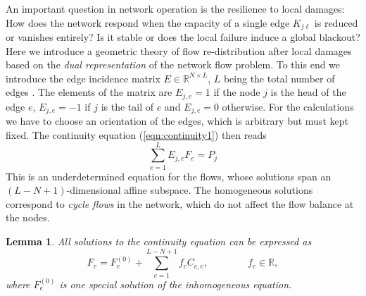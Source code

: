 \documentclass[10pt,aps,pra,twocolumn,superscriptaddress]{revtex4-1}
\newcommand{\be}{\begin{equation}}
\newcommand{\ee}{\end{equation}}
\newtheorem{lemma}{Lemma}
\begin{document}
An important question in network operation is the resilience to local damages: How does the network respond when the capacity of a single edge $K_{j \ell}$ is reduced or vanishes entirely? Is it stable or does the local failure induce a global blackout? Here we introduce a geometric theory of flow re-distribution after local damages based on the \emph{dual representation} of the network flow problem. To this end we introduce the edge incidence matrix $E \in \mathbb{R}^{N \times L}$, $L$ being the total number of edges \cite{Newm10}. The elements of the matrix are $E_{j,e}=1$ if the node $j$ is the head of the edge $e$, $E_{j,e}=-1$ if $j$ is the tail of $e$ and $E_{j,e}=0$ otherwise. For the calculations we have to choose an orientation of the edges, which is arbitrary but must kept fixed. The continuity equation (\ref{eqn:continuity1}) then reads
\be
    \sum_{e=1}^L E_{j,e} F_e = P_j
    \label{eqn:continuity3}
\ee
This is an underdetermined equation for the flows, whose solutions span an $(L-N+1)$-dimensional affine subspace. The homogeneous solutions correspond to \emph{cycle flows} in the network, which do not affect the flow balance at the nodes. 


\begin{lemma} 
All solutions to the continuity equation can be expressed as
\be
   F_e = F_e^{(0)} + \sum_{c=1}^{L-N+1} f_c C_{c,e}, \qquad \qquad
     f_c \in \mathbb{R},
   \label{eqn:sol-cycle}
\ee 
where $F_e^{(0)}$ is one special solution of the inhomogeneous equation. 
\end{lemma}
\end{document}
